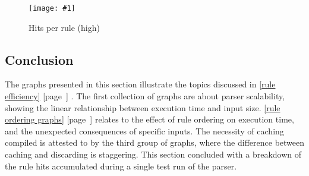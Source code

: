 \documentclass[a4paper,12pt,draft]{article}
\newcommand{\showgraph}[3]{
    \begin{figure}[hbt!]
        \caption{#2}\label{#3}
        \texttt{[image: \#1]}
    \end{figure}
}
\newcommand{\refwithpage}[1]{%
    \empty{}\ref{#1} [page~\pageref{#1}]%
}
\newcommand{\sectionref}[1]{%
    \textsection{}\refwithpage{#1}%
}
\begin{document}
\showgraph{build/plot-hits-high}{Hits per rule (high)}{hits per rule
high}

\clearpage

\subsection{Conclusion}

The graphs presented in this section illustrate the topics discussed in
\sectionref{rule efficiency}.  The first collection of graphs are about
parser scalability, showing the linear relationship between execution time
and input size.  \sectionref{rule ordering graphs} relates to the effect of
rule ordering on execution time, and the unexpected consequences of
specific inputs.  The necessity of caching compiled \regexes{} is attested
to by the third group of graphs, where the difference between caching and
discarding is staggering.  This section concluded with a breakdown of the
rule hits accumulated during a single test run of the parser.


\renewcommand{\glossarytitle}{\section{Glossary}\label{Glossary}}
\printglossary{}
\renewcommand{\glossarytitle}{\section{Acronyms}\label{Acronyms}}
\printacronym{}

\end{document}
